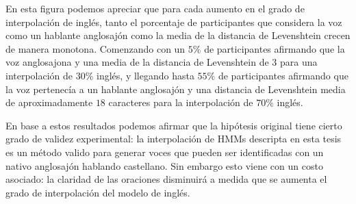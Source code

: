 En esta figura podemos apreciar que para cada aumento en el grado de interpolación de inglés, tanto el porcentaje de participantes que considera la voz como un hablante anglosajón como la media de la distancia de Levenshtein crecen de manera monotona. Comenzando con un $5\%$ de participantes afirmando que la voz anglosajona y una media de la distancia de Levenshtein de $3$ para una interpolación de $30\%$ inglés, y llegando hasta $55\%$ de participantes afirmando que la voz pertenecía a un hablante anglosajón y una distancia de Levenshtein media de aproximadamente $18$ caracteres para la interpolación de $70\%$ inglés.

En base a estos resultados podemos afirmar que la hipótesis original tiene cierto grado de validez experimental: la interpolación de HMMs descripta en esta tesis es un método valido para generar voces que pueden ser identificadas con un nativo anglosajón hablando castellano. Sin embargo esto viene con un costo asociado: la claridad de las oraciones disminuirá a medida que se aumenta el grado de interpolación del modelo de inglés.

\unificarGradoInglesGradoCastellanoAGradoIngles
\IntroducirEstaNomenclatura